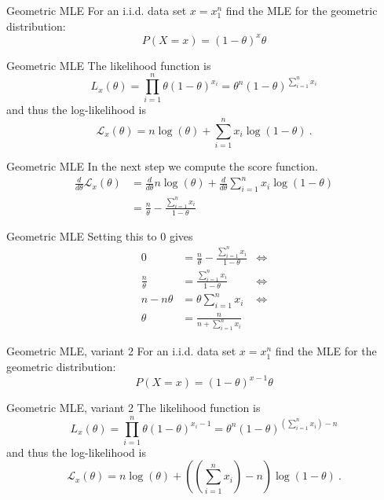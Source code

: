 \documentclass[14pt]{beamer}
\begin{document}
\begin{frame}{Geometric MLE}
For an i.i.d. data set $ x = x_{1}^{n} $ find the MLE for the geometric distribution:
$$ P(X=x) = (1-\theta)^{x}\theta $$
\end{frame}

\begin{frame}{Geometric MLE}
The likelihood function is
$$ L_{x}(\theta) = \prod_{i=1}^{n} \theta(1-\theta)^{x_{i}} = \theta^{n} (1-\theta)^{\sum_{i=1}^{n}x_{i}} $$
and thus the log-likelihood is
$$ \mathcal{L}_{x}(\theta) = n\log(\theta) + \sum_{i=1}^{n}x_{i}\log(1-\theta) \ . $$
\end{frame}

\begin{frame}{Geometric MLE}
In the next step we compute the score function.
\begin{align*}
\frac{d}{d\theta}\mathcal{L}_{x}(\theta) &= \frac{d}{d\theta}n\log(\theta) + \frac{d}{d\theta}\sum_{i=1}^{n}x_{i}\log(1-\theta) \\
&= \frac{n}{\theta} - \frac{\sum_{i=1}^{n}x_{i}}{1-\theta}
\end{align*}
\end{frame}

\begin{frame}{Geometric MLE}
Setting this to 0 gives
\begin{align*}
0 &= \frac{n}{\theta} - \frac{\sum_{i=1}^{n}x_{i}}{1-\theta} &\Leftrightarrow \\
\frac{n}{\theta} &= \frac{\sum_{i=1}^{n}x_{i}}{1-\theta} &\Leftrightarrow \\
n - n\theta &= \theta \sum_{i=1}^{n}x_{i} &\Leftrightarrow \\
\theta &= \frac{n}{n + \sum_{i=1}^{n}x_{i}}&
\end{align*}
\end{frame}

\begin{frame}{Geometric MLE, variant 2}
For an i.i.d. data set $ x = x_{1}^{n} $ find the MLE for the geometric distribution:
$$ P(X=x) = (1-\theta)^{x-1}\theta $$
\end{frame}

\begin{frame}{Geometric MLE, variant 2}
The likelihood function is
$$ L_{x}(\theta) = \prod_{i=1}^{n} \theta(1-\theta)^{x_{i}-1} =
\theta^{n} (1-\theta)^{(\sum_{i=1}^{n}x_{i}) - n} $$
and thus the log-likelihood is
$$ \mathcal{L}_{x}(\theta) = n\log(\theta) + \left(\left(\sum_{i=1}^{n}x_{i}\right) - n\right)
\log(1-\theta) \ . $$
\end{frame}
\end{document}
